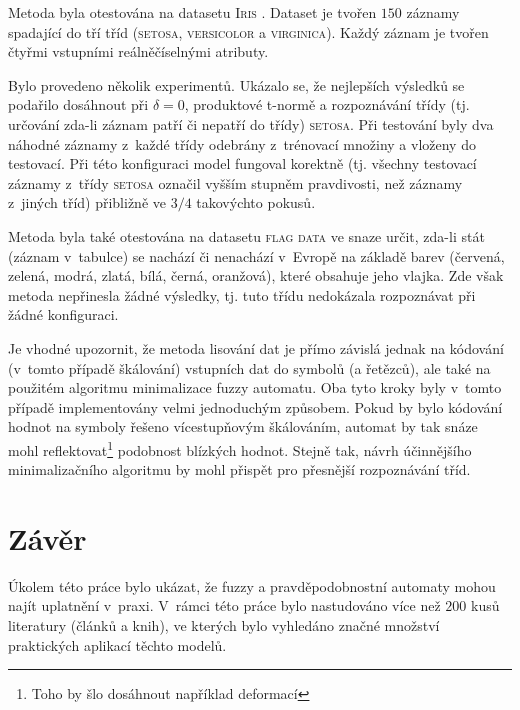 Metoda byla otestována na datasetu \textsc{Iris} \cite{web-IrisDataset}. Dataset je tvořen $150$ záznamy spadající do tří tříd (\textsc{setosa}, \textsc{versicolor} a \textsc{virginica}). Každý záznam je tvořen čtyřmi vstupními reálněčíselnými atributy.

Bylo provedeno několik experimentů. Ukázalo se, že nejlepších výsledků se podařilo dosáhnout při $\delta = 0$, produktové t-normě a rozpoznávání třídy (tj. určování zda-li záznam patří či nepatří do třídy) \textsc{setosa}. Při testování byly dva náhodné záznamy z~každé třídy odebrány z~trénovací množiny a vloženy do testovací. Při této konfiguraci model fungoval korektně (tj. všechny testovací záznamy z~třídy \textsc{setosa} označil vyšším stupněm pravdivosti, než záznamy z~jiných tříd) přibližně ve $3/4$ takovýchto pokusů.

Metoda byla také otestována na datasetu \textsc{flag data} \cite{web-FlagsDataset} ve snaze určit, zda-li stát (záznam v~tabulce) se nachází či nenachází v~Evropě na základě barev (červená, zelená, modrá, zlatá, bílá, černá, oranžová), které obsahuje jeho vlajka. Zde však metoda nepřinesla žádné výsledky, tj. tuto třídu nedokázala rozpoznávat při žádné konfiguraci.

Je vhodné upozornit, že metoda lisování dat je přímo závislá jednak na kódování (v~tomto případě škálování) vstupních dat do symbolů (a řetězců), ale také na použitém algoritmu minimalizace fuzzy automatu. Oba tyto kroky byly v~tomto případě implementovány velmi jednoduchým způsobem. Pokud by bylo kódování hodnot na symboly řešeno vícestupňovým škálováním, automat by tak snáze mohl reflektovat\footnote{Toho by šlo dosáhnout například deformací } podobnost blízkých hodnot. Stejně tak, návrh účinnějšího minimalizačního algoritmu by mohl přispět pro přesnější rozpoznávání tříd.


\section{Závěr}
Úkolem této práce bylo ukázat, že fuzzy a pravděpodobnostní automaty mohou najít uplatnění v~praxi. V~rámci této práce bylo nastudováno více než $200$ kusů literatury (článků a knih), ve kterých bylo vyhledáno značné množství praktických aplikací těchto modelů.

